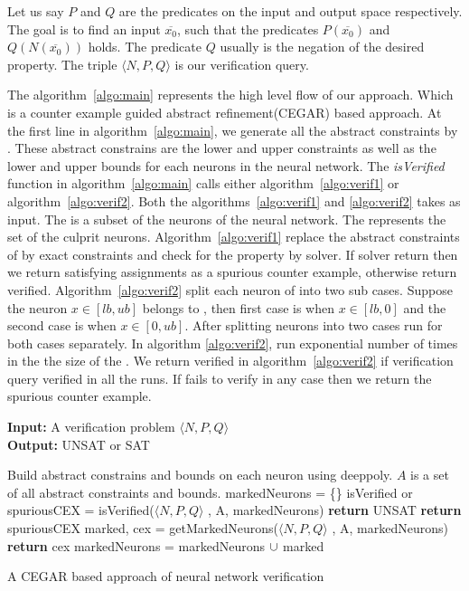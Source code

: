Let us say $P$ and $Q$ are the predicates on the input and output space respectively. 
The goal is to find an input $\overline{x_0}$, such that the predicates $P(\overline{x_0})$ and $Q(N(\overline{x_0}))$ holds. 
The predicate $Q$ usually is the negation of the desired property. The triple $\langle N, P, Q \rangle$ is our verification query. 

The algorithm~\ref{algo:main} represents the high level flow of our approach. Which is a counter example guided abstract refinement(CEGAR) based approach. 
At the first line in algorithm~\ref{algo:main}, we generate all the abstract constraints by \deeppoly{}. These abstract constrains
are the lower and upper constraints as well as the lower and upper bounds for each neurons in the neural network.
The \emph{isVerified} function in algorithm~\ref{algo:main} calls either algorithm~\ref{algo:verif1} or algorithm~\ref{algo:verif2}. 
Both the algorithms~\ref{algo:verif1} and \ref{algo:verif2} takes \markednewrons{} as input. The \markednewrons{} 
is a subset of the neurons of the neural network. The \markednewrons{} represents the set of the culprit neurons. 
Algorithm~\ref{algo:verif1} replace the abstract constraints of \markednewrons{} by exact constraints and check for the 
property by \milp{} solver. If \milp{} solver return \sat{} then we return satisfying assignments as a spurious counter example, 
otherwise return verified. Algorithm~\ref{algo:verif2} split each neuron of \markednewrons{} into two sub cases. Suppose the 
neuron $x\in [lb,ub]$ belongs to \markednewrons{}, then first case is when $x \in [lb,0]$ and the second case is when $x \in [0,ub]$.   
After splitting neurons into two cases \deeppoly{} run for both cases separately. In algorithm \ref{algo:verif2}, \deeppoly{}
run exponential number of times in the the size of the \markednewrons{}. We return verified in algorithm~\ref{algo:verif2} if 
verification query verified in all the \deeppoly{} runs. If \deeppoly{} fails to verify in any case then we return the spurious counter example. 


\begin{algorithm}[t]
  \textbf{Input: } A verification problem $\langle N,P,Q \rangle$ \\
  \textbf{Output: } UNSAT or SAT
  \begin{algorithmic}[1]
    \State Build abstract constrains and bounds on each neuron using deeppoly.
    \State $A$ is a set of all abstract constraints and bounds. 
    \State markedNeurons = \{\}
      \State isVerified or spuriousCEX = isVerified($\langle N,P,Q \rangle$ , A, markedNeurons)
        \State \textbf{return} UNSAT
      \Else
          \State \textbf{return} spuriousCEX
        \Else
          \State marked, cex = getMarkedNeurons($\langle N,P,Q \rangle$ , A, markedNeurons)
            \State \textbf{return} cex
          \EndIf
          \State markedNeurons = markedNeurons ${\cup}$ marked
        \EndIf
      \EndIf
    \EndWhile
  \end{algorithmic}
  \caption{A CEGAR based approach of neural network verification}
  \label{algo:main}
\end{algorithm}

